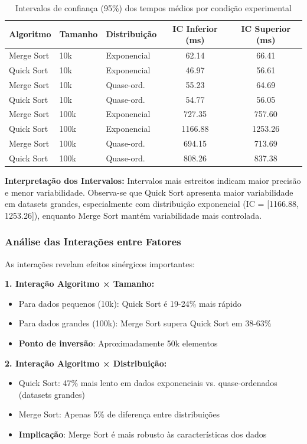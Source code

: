 \documentclass[conference]{IEEEtran}
\begin{document}
\begin{table}[H]
\centering
\caption{Intervalos de confiança (95\%) dos tempos médios por condição experimental}
\label{tab:intervalos_confianca}
\scriptsize
\begin{tabular}{|l|l|l|c|c|}
\hline
\textbf{Algoritmo} & \textbf{Tamanho} & \textbf{Distribuição} & \textbf{IC Inferior (ms)} & \textbf{IC Superior (ms)} \\
\hline
Merge Sort & 10k & Exponencial & 62.14 & 66.41 \\
\hline
Quick Sort & 10k & Exponencial & 46.97 & 56.61 \\
\hline
Merge Sort & 10k & Quase-ord. & 55.23 & 64.69 \\
\hline
Quick Sort & 10k & Quase-ord. & 54.77 & 56.05 \\
\hline
Merge Sort & 100k & Exponencial & 727.35 & 757.60 \\
\hline
Quick Sort & 100k & Exponencial & 1166.88 & 1253.26 \\
\hline
Merge Sort & 100k & Quase-ord. & 694.15 & 713.69 \\
\hline
Quick Sort & 100k & Quase-ord. & 808.26 & 837.38 \\
\hline
\end{tabular}
\end{table}

\textbf{Interpretação dos Intervalos:} Intervalos mais estreitos indicam maior precisão e menor variabilidade. Observa-se que Quick Sort apresenta maior variabilidade em datasets grandes, especialmente com distribuição exponencial (IC = [1166.88, 1253.26]), enquanto Merge Sort mantém variabilidade mais controlada.

\subsubsection{Análise das Interações entre Fatores}

As interações revelam efeitos sinérgicos importantes:

\textbf{1. Interação Algoritmo × Tamanho:}
\begin{itemize}
\item Para dados pequenos (10k): Quick Sort é 19-24\% mais rápido
\item Para dados grandes (100k): Merge Sort supera Quick Sort em 38-63\%
\item \textbf{Ponto de inversão}: Aproximadamente 50k elementos
\end{itemize}

\textbf{2. Interação Algoritmo × Distribuição:}
\begin{itemize}
\item Quick Sort: 47\% mais lento em dados exponenciais vs. quase-ordenados (datasets grandes)
\item Merge Sort: Apenas 5\% de diferença entre distribuições
\item \textbf{Implicação}: Merge Sort é mais robusto às características dos dados
\end{itemize}
\end{document}
